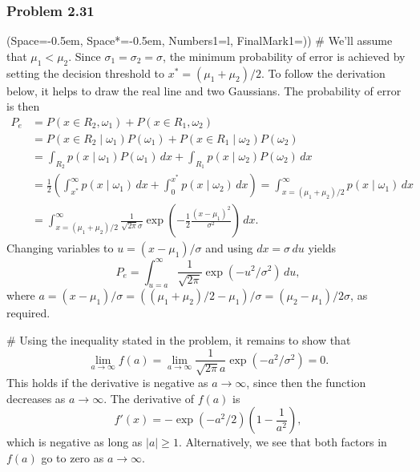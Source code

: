 \documentclass[12pt, a4paper]{article}
\newcommand{\listSpace}{-0.5em}%
\newcommand{\abs}[1]{\left\lvert#1\right\rvert}
\begin{document}
\subsubsection*{Problem 2.31}
\begin{easylist}[enumerate]
\ListProperties(Space=\listSpace, Space*=\listSpace, Numbers1=l, FinalMark1={)})
# We'll assume that $\mu_1 < \mu_2$.
Since $\sigma_1 = \sigma_2 = \sigma$, the minimum probability of error is achieved by setting the decision threshold to $x^* = (\mu_1 + \mu_2)/2$.
To follow the derivation below, it helps to draw the real line and two Gaussians.
The probability of error is then
\begin{align*}
	P_e &= P(x \in R_2, \omega_1) + P(x \in R_1, \omega_2) \\
	&= 
	P(x \in R_2  \mid  \omega_1) P(\omega_1)  + P(x \in R_1  \mid  \omega_2) P(\omega_2) \\&= 
	\int_{R_2} p(x  \mid  \omega_1) P(\omega_1) \, dx + \int_{R_1} p(x  \mid  \omega_2) P(\omega_2) \, dx
	 \\
	 &= \frac{1}{2}\left( \int_{x^*}^{\infty} p(x  \mid  \omega_1) \, dx + 
	 \int_{0}^{x^*} p(x  \mid  \omega_2) \, dx \right) = \int_{x =(\mu_1 + \mu_2)/2 }^{\infty} p(x  \mid  \omega_1) \, dx \\
	 &=
	 \int_{x =(\mu_1 + \mu_2)/2 }^{\infty} \frac{1}{\sqrt{2 \pi } \sigma} \exp\left( - \frac{1}{2} \frac{(x - \mu_1)^2}{\sigma^2}\right) \, dx.
\end{align*}
Changing variables to $u = (x - \mu_1) / \sigma$ and using $dx = \sigma \, du$ yields
\begin{equation*}
	P_e = \int_{u=a}^{\infty} \frac{1}{\sqrt{2 \pi }} \exp\left( -u^2 /\sigma^2 \right) \, du,
\end{equation*}
where $a = (x - \mu_1 )/\sigma = ((\mu_1 + \mu_2)/2 - \mu_1 )/\sigma =  (\mu_2 - \mu_1) / 2 \sigma$, as required.

# Using the inequality stated in the problem, it remains to show that
\begin{equation*}
	\lim_{a \to \infty} f(a) = \lim_{a \to \infty} \frac{1}{\sqrt{2 \pi} a} \exp\left( -a^2 /\sigma^2 \right) = 0.
\end{equation*}
This holds if the derivative is negative as $a \to \infty$, since then the function decreases as $a \to \infty$. The derivative of $f(a)$ is
\begin{equation*}
	f'(x) = -\exp\left( -a^2 / 2\right) \left( 1 - \frac{1}{a^2}\right),
\end{equation*}
which is negative as long as $\abs{a} \geq 1$.
Alternatively, we see that both factors in $f(a)$ go to zero as $a \to \infty$.
\end{easylist}
\end{document}
